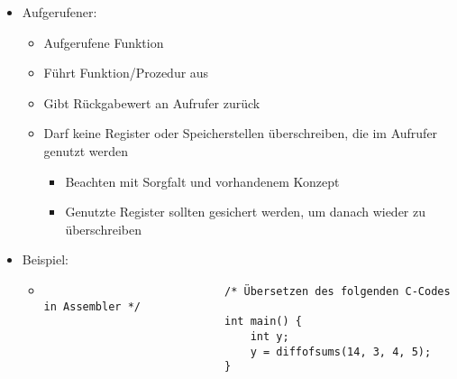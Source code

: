 \begin{itemize}
\begin{itemize}
                \item Aufgerufener:
                    \begin{itemize}
                        \item Aufgerufene Funktion
                        \item Führt Funktion/Prozedur aus
                        \item Gibt Rückgabewert an Aufrufer zurück 
                        \item Darf keine Register oder Speicherstellen überschreiben, die im Aufrufer genutzt werden
                            \begin{itemize}
                                \item Beachten mit Sorgfalt und vorhandenem Konzept
                                \item Genutzte Register sollten gesichert werden, um danach wieder zu überschreiben
                            \end{itemize}
                    \end{itemize}
                
                \item Beispiel:
                    \begin{itemize}
                        \item[]
                            \begin{verbatim}
                            /* Übersetzen des folgenden C-Codes in Assembler */
                            int main() {
                                int y;
                                y = diffofsums(14, 3, 4, 5); 
                            }


\end{verbatim}
\end{itemize}
\end{itemize}
\end{itemize}

